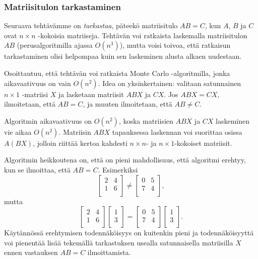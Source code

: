 \subsubsection{Matriisitulon tarkastaminen}


Seuraava tehtävämme on \emph{tarkastaa},
päteekö matriisitulo $AB=C$, kun $A$, $B$ ja $C$
ovat $n \times n$ -kokoisia matriiseja.
Tehtävän voi ratkaista laskemalla matriisitulon
$AB$ (perusalgoritmilla ajassa $O(n^3)$), mutta voisi toivoa,
että ratkaisun tarkastaminen olisi helpompaa
kuin sen laskeminen alusta alkaen uudestaan.

Osoittautuu, että tehtävän voi ratkaista
Monte Carlo -algoritmilla,
jonka aikavaativuus on vain $O(n^2)$.
Idea on yksinkertainen: valitaan satunnainen
$n \times 1$ -matriisi $X$ ja lasketaan
matriisit $ABX$ ja $CX$.
Jos $ABX=CX$, ilmoitetaan, että $AB=C$,
ja muuten ilmoitetaan, että $AB \neq C$.

Algoritmin aikavaativuus on $O(n^2)$,
koska matriisien $ABX$ ja $CX$ laskeminen
vie aikaa $O(n^2)$.
Matriisin $ABX$ tapauksessa laskennan
voi suorittaa osissa $A(BX)$, jolloin riittää
kertoa kahdesti $n \times n$- ja $n \times 1$-kokoiset
matriisit.

Algoritmin heikkoutena on, että on pieni mahdollisuus,
että algoritmi erehtyy, kun se ilmoittaa, että $AB=C$.
Esimerkiksi 
\[
 \begin{bmatrix}
  2 & 4 \\
  1 & 6 \\
 \end{bmatrix}
\neq
 \begin{bmatrix}
  0 & 5 \\
  7 & 4 \\
 \end{bmatrix},
\]
mutta
\[
 \begin{bmatrix}
  2 & 4 \\
  1 & 6 \\
 \end{bmatrix}
 \begin{bmatrix}
  1 \\
  3 \\
 \end{bmatrix}
=
 \begin{bmatrix}
  0 & 5 \\
  7 & 4 \\
 \end{bmatrix}
 \begin{bmatrix}
  1 \\
  3 \\
 \end{bmatrix}.
\]
Käytännössä erehtymisen todennäköisyys on kuitenkin
pieni ja todennäköisyyttä voi pienentää lisää
tekemällä tarkastuksen usealla
satunnaisella matriisilla $X$ ennen vastauksen
$AB=C$ ilmoittamista.

